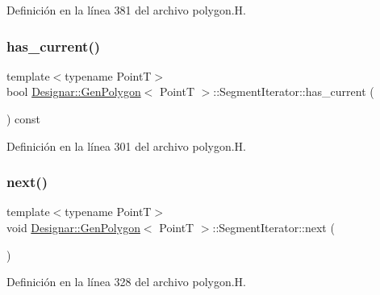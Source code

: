 Definición en la línea 381 del archivo polygon.\+H.

\mbox{\label{class_designar_1_1_gen_polygon_1_1_segment_iterator_a5a00faaa26edbf38c59d8d578e8e7d1b}} 
\subsubsection{\texorpdfstring{has\+\_\+current()}{has\_current()}}
{\footnotesize\ttfamily template$<$typename PointT$>$ \\
bool \hyperlink{class_designar_1_1_gen_polygon}{Designar\+::\+Gen\+Polygon}$<$ PointT $>$\+::Segment\+Iterator\+::has\+\_\+current (\begin{DoxyParamCaption}{ }\end{DoxyParamCaption}) const\hspace{0.3cm}{\ttfamily [inline]}}



Definición en la línea 301 del archivo polygon.\+H.

\mbox{\label{class_designar_1_1_gen_polygon_1_1_segment_iterator_a29ad4efa177e5747bbd3fb181924f452}} 
\subsubsection{\texorpdfstring{next()}{next()}}
{\footnotesize\ttfamily template$<$typename PointT$>$ \\
void \hyperlink{class_designar_1_1_gen_polygon}{Designar\+::\+Gen\+Polygon}$<$ PointT $>$\+::Segment\+Iterator\+::next (\begin{DoxyParamCaption}{ }\end{DoxyParamCaption})\hspace{0.3cm}{\ttfamily [inline]}}



Definición en la línea 328 del archivo polygon.\+H.


